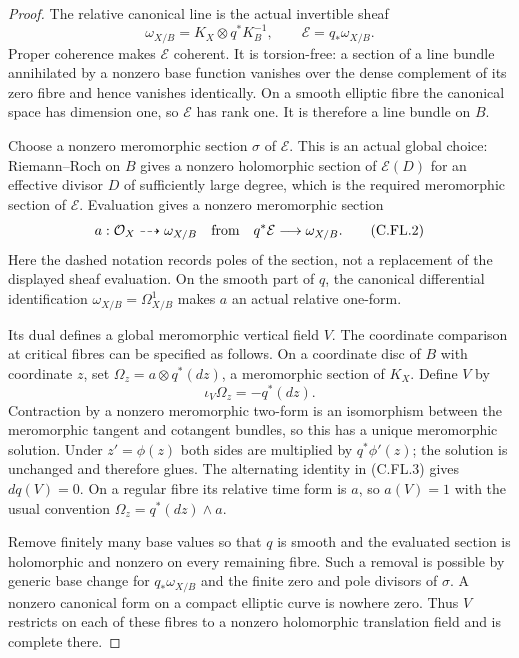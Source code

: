 \begin{proof}
The relative canonical line is the actual invertible
sheaf
\[
 \omega_{X/B}=K_X\otimes q^*K_B^{-1},
 \qquad \mathcal E=q_*\omega_{X/B}.
                                                               \tag{C.FL.1}
\]
Proper coherence makes $\mathcal E$ coherent. It is
torsion-free: a section of a line bundle annihilated
by a nonzero base function vanishes over the dense
complement of its zero fibre and hence vanishes
identically. On a smooth elliptic fibre the canonical
space has dimension one, so $\mathcal E$ has rank one.
It is therefore a line bundle on $B$.

Choose a nonzero meromorphic section $\sigma$ of
$\mathcal E$. This is an actual global choice:
Riemann--Roch on $B$ gives a nonzero holomorphic
section of $\mathcal E(D)$ for an effective divisor
$D$ of sufficiently large degree, which is the
required meromorphic section of $\mathcal E$.
Evaluation gives a nonzero meromorphic section
\[
 a:\mathcal O_X\dashrightarrow\omega_{X/B}
       \quad\hbox{from}\quad q^*\mathcal E\longrightarrow
                                      \omega_{X/B}.
                                                               \tag{C.FL.2}
\]
Here the dashed notation records poles of the section,
not a replacement of the displayed sheaf evaluation.
On the smooth part of $q$, the canonical differential
identification $\omega_{X/B}=\Omega^1_{X/B}$ makes
$a$ an actual relative one-form.

Its dual defines a global meromorphic vertical field
$V$. The coordinate comparison at critical fibres
can be specified as follows. On a coordinate disc
of $B$ with coordinate $z$, set
$\Omega_z=a\otimes q^*(dz)$, a meromorphic section
of $K_X$. Define $V$ by
\[
                   \iota_V\Omega_z=-q^*(dz).
                                                               \tag{C.FL.3}
\]
Contraction by a nonzero meromorphic two-form is an
isomorphism between the meromorphic tangent and
cotangent bundles, so this has a unique meromorphic
solution. Under $z'=\phi(z)$ both sides are multiplied
by $q^*\phi'(z)$; the solution is unchanged and
therefore glues. The alternating identity in
(C.FL.3) gives $dq(V)=0$. On a regular fibre its
relative time form is $a$, so $a(V)=1$ with the
usual convention $\Omega_z=q^*(dz)\wedge a$.

Remove finitely many base values so that $q$ is
smooth and the evaluated section is holomorphic
and nonzero on every remaining fibre. Such a
removal is possible by generic base change for
$q_*\omega_{X/B}$ and the finite zero and pole
divisors of $\sigma$. A nonzero canonical form
on a compact elliptic curve is nowhere zero.
Thus $V$ restricts on each of these fibres to
a nonzero holomorphic translation field and is
complete there.


\end{proof}

